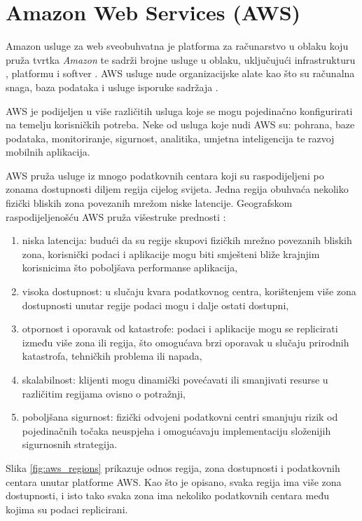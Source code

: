 \chapter{Amazon Web Services (AWS)}

Amazon usluge za web  sveobuhvatna je platforma za računarstvo u oblaku koju pruža tvrtka \textit{Amazon} te sadrži brojne usluge u oblaku, uključujući infrastrukturu , platformu  i softver . AWS usluge nude organizacijske alate kao što su računalna snaga, baza podataka i usluge isporuke sadržaja \cite{what_is_aws}. 

AWS je podijeljen u više različitih usluga koje se mogu pojedinačno konfigurirati na temelju korisničkih potreba. Neke od usluga koje nudi AWS su: pohrana, baze podataka, monitoriranje, sigurnost, analitika, umjetna inteligencija te razvoj mobilnih aplikacija. 

AWS pruža usluge iz mnogo podatkovnih centara  koji su raspodijeljeni po zonama dostupnosti  diljem regija cijelog svijeta. Jedna regija obuhvaća nekoliko fizički bliskih zona povezanih mrežom niske latencije. Geografskom raspodijeljenošću AWS pruža višestruke prednosti \cite{aws_regions}:
\begin{enumerate}
	\item niska latencija: budući da su regije skupovi fizičkih mrežno povezanih bliskih zona, korisnički podaci i aplikacije mogu biti smješteni bliže krajnjim korisnicima što poboljšava performanse aplikacija,
	\item visoka dostupnost: u slučaju kvara podatkovnog centra, korištenjem više zona dostupnosti unutar regije podaci mogu i dalje ostati dostupni,
	\item otpornost i oporavak od katastrofe: podaci i aplikacije mogu se replicirati između više zona ili regija, što omogućava brzi oporavak u slučaju prirodnih katastrofa, tehničkih problema ili napada,
	\item skalabilnost: klijenti mogu dinamički povećavati ili smanjivati resurse u različitim regijama ovisno o potražnji,
	\item poboljšana sigurnost: fizički odvojeni podatkovni centri smanjuju rizik od pojedinačnih točaka neuspjeha i omogućavaju implementaciju složenijih sigurnosnih strategija.
\end{enumerate}

Slika \ref{fig:aws_regions} prikazuje odnos regija, zona dostupnosti i podatkovnih centara unutar platforme AWS. Kao što je opisano, svaka regija ima više zona dostupnosti, i isto tako svaka zona ima nekoliko podatkovnih centara među kojima su podaci replicirani. 

